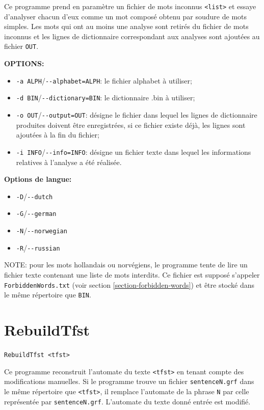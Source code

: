 \bigskip
\noindent Ce programme prend en paramètre un fichier de mots inconnus \verb+<list>+ et essaye d’analyser chacun d’eux comme un mot composé obtenu par soudure de mots simples. Les mots
qui ont au moins une analyse sont retirés du fichier de mots inconnus et les lignes de dictionnaire
correspondant aux analyses sont ajoutées au fichier \verb+OUT+.

\bigskip
\noindent \textbf{OPTIONS:}
\begin{itemize}
  \item \verb+-a ALPH+/\verb+--alphabet=ALPH+: le fichier alphabet à utiliser;

  \item \verb+-d BIN+/\verb+--dictionary=BIN+: le dictionnaire .bin à utiliser;

  \item \verb+-o OUT+/\verb+--output=OUT+: désigne le fichier dans lequel les
  lignes de dictionnaire produites doivent être enregistrées, si ce fichier existe déjà,
  les lignes sont ajoutées à la fin du fichier;

  \item \verb+-i INFO+/\verb+--info=INFO+: désigne un fichier texte dans lequel
   les informations relatives à l'analyse a été réalisée.
\end{itemize}

\bigskip
\noindent \textbf{Options de langue:}
\begin{itemize}
  \item \verb+-D+/\verb+--dutch+
  \item \verb+-G+/\verb+--german+
  \item \verb+-N+/\verb+--norwegian+
  \item \verb+-R+/\verb+--russian+
\end{itemize}  

\bigskip
\noindent NOTE: pour les mots hollandais ou norvégiens, le programme tente de lire un fichier texte
contenant une liste de mots interdits. Ce fichier est supposé s'appeler
\verb+ForbiddenWords.txt+ (voir section \ref{section-forbidden-words}) et être stocké
dans le même répertoire que \verb+BIN+.



\section{RebuildTfst}
\verb+RebuildTfst <tfst>+

\bigskip
\noindent {}Ce programme reconstruit l'automate du texte \verb+<tfst>+ en tenant compte des modifications manuelles. Si le programme trouve un fichier \verb+sentenceN.grf+ dans le même répertoire que \verb+<tfst>+, il remplace l'automate de la phrase \verb+N+ par celle représentée par \verb+sentenceN.grf+. L'automate du texte donné entrée est modifié.






